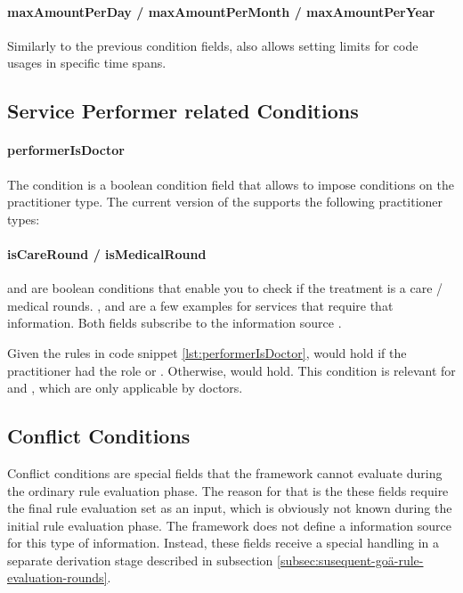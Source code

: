\paragraph{maxAmountPerDay / maxAmountPerMonth / maxAmountPerYear}
Similarly to the previous condition fields, \RL also allows setting limits for code usages in specific time spans.

\subsection{Service Performer related Conditions}\label{subsec:service-performer-related-conditions}

\paragraph{performerIsDoctor}
The  condition is a boolean condition field that allows to impose conditions on the practitioner type.
The current version of the \AVS supports the following practitioner types:

\paragraph{isCareRound / isMedicalRound}
 and  are boolean conditions that enable you to check if the treatment is a care / medical rounds.
,  and  are a few examples for services that require that information.
Both fields subscribe to the information source .




Given the rules in code snippet \ref{lst:performerIsDoctor},  would hold if the practitioner had the role 
or .
Otherwise,  would hold.
This condition is relevant for  and , which are only applicable by doctors.



\subsection{Conflict Conditions}\label{subsec:conflict-conditions}
Conflict conditions are special fields that the framework cannot evaluate during the ordinary rule evaluation phase.
The reason for that is the these fields require the final rule evaluation set as an input, which is obviously not known during the initial rule evaluation phase.
The framework does not define a information source for this type of information.
Instead, these fields receive a special handling in a separate derivation stage described in subsection \ref{subsec:susequent-goä-rule-evaluation-rounds}.


